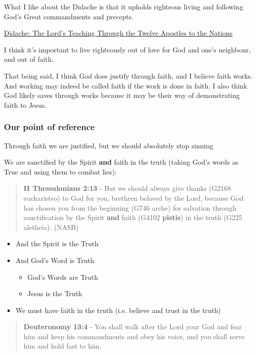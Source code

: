 \documentclass[11pt]{article}
\begin{document}
What I like about the Didache is that it upholds righteous living and following God's Great commandments and precepts.

\href{https://www.earlychristianwritings.com/text/didache-roberts.html}{Didache: The Lord's Teaching Through the Twelve Apostles to the Nations}

I think it's important to live righteously out of love for God and one's neighbour, and out of faith.

That being said, I think God does justify through faith, and I believe faith works. And working may indeed be called faith if the work is done in faith.
I also think God likely saves through works because it may be their way of demonstrating faith to Jesus.

\subsubsection{Our point of reference}
\label{sec:org9f796e0}

Through faith we are justified, but we should absolutely stop sinning

We are sanctified by the Spirit \textbf{and} faith in the truth (taking God's words as True and using them to combat lies):

\begin{quote}
\textbf{II Thessalonians 2:13} - But we should always give thanks (G2168 eucharisteo) to God for you, brethren beloved by the Lord, because God has chosen you from the beginning (G746 arche) for salvation through sanctification by the Spirit \textbf{and} faith (G4102 \textbf{pistis}) in the truth (G225 aletheia). (NASB)
\end{quote}

\begin{itemize}
\item And the Spirit is the Truth
\item And God's Word is Truth
\begin{itemize}
\item God's Words are Truth
\item Jesus is the Truth
\end{itemize}
\item We must have faith in the truth (i.e. believe and trust in the truth)
\end{itemize}

\begin{quote}
\textbf{Deuteronomy 13:4} - You shall walk after the Lord your God and fear him and keep his commandments and obey his voice, and you shall serve him and hold fast to him.
\end{quote}
\end{document}
